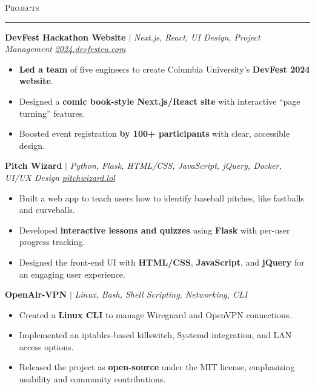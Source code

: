 \documentclass[11pt,letterpaper]{article}
\begin{document}
\vspace{4pt}
\textsc{\large{Projects}} 
\vspace{4pt}
\hrule
\begin{list}{}{\setlength{\leftmargin}{1em}\setlength{\rightmargin}{2pt}}
  
    \item
        \small{\textbf{DevFest Hackathon Website}} $|$ \small{\textit{Next.js, React, UI Design, Project Management}} \hfill \small{\textit{\href{https://2024.devfestcu.com/}{2024.devfestcu.com}}}
          \begin{itemize}[itemsep=-5pt, topsep=-2pt]
              \item \textbf{Led a team} of five engineers to create Columbia University's \textbf{DevFest 2024 website}.
              \item Designed a \textbf{comic book-style Next.js/React site} with interactive ``page turning'' features.
              \item Boosted event registration \textbf{by 100+ participants} with clear, accessible design.
          \end{itemize}
          \vspace{4pt}

    \item
        \small{\textbf{Pitch Wizard}} $|$ \small{\textit{Python, Flask, HTML/CSS, JavaScript, jQuery, Docker, UI/UX Design}} \hfill \small{\textit{\href{https://pitchwizard.lol/}{pitchwizard.lol}}}
          \begin{itemize}[itemsep=-5pt, topsep=-2pt]
              \item Built a web app to teach users how to identify baseball pitches, like fastballs and curveballs.
              \item Developed \textbf{interactive lessons and quizzes} using \textbf{Flask} with per-user progress tracking.
              \item Designed the front-end UI with \textbf{HTML/CSS}, \textbf{JavaScript}, and \textbf{jQuery} for an engaging user experience.
          \end{itemize}
          \vspace{4pt}
    
    \item
        \small{\textbf{OpenAir-VPN}} $|$ \small{\textit{Linux, Bash, Shell Scripting, Networking, CLI}} \hfill \small{\textit{}}
          \begin{itemize}[itemsep=-5pt, topsep=-2pt]
              \item Created a \textbf{Linux CLI} to manage Wireguard and OpenVPN connections.
              \item Implemented an iptables-based killswitch, Systemd integration, and LAN access options.
              \item Released the project as \textbf{open-source} under the MIT license, emphasizing usability and community contributions.
          \end{itemize}
          \vspace{4pt}
    

\end{list}
\end{document}
